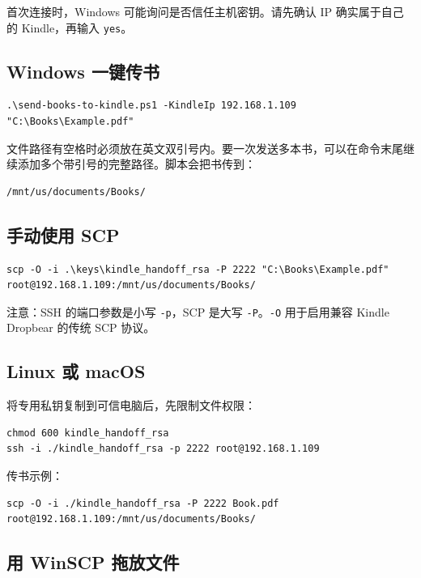 \documentclass[10pt,a4paper]{article}
\begin{document}
首次连接时，Windows 可能询问是否信任主机密钥。请先确认 IP 确实属于自己的 Kindle，再输入 \texttt{yes}。

\subsection{Windows 一键传书}

\begin{Verbatim}[fontsize=\small]
.\send-books-to-kindle.ps1 -KindleIp 192.168.1.109 "C:\Books\Example.pdf"
\end{Verbatim}

文件路径有空格时必须放在英文双引号内。要一次发送多本书，可以在命令末尾继续添加多个带引号的完整路径。脚本会把书传到：

\begin{Verbatim}[fontsize=\small]
/mnt/us/documents/Books/
\end{Verbatim}

\subsection{手动使用 SCP}

\begin{Verbatim}[fontsize=\footnotesize]
scp -O -i .\keys\kindle_handoff_rsa -P 2222 "C:\Books\Example.pdf" root@192.168.1.109:/mnt/us/documents/Books/
\end{Verbatim}

注意：SSH 的端口参数是小写 \texttt{-p}，SCP 是大写 \texttt{-P}。\texttt{-O} 用于启用兼容 Kindle Dropbear 的传统 SCP 协议。

\subsection{Linux 或 macOS}

将专用私钥复制到可信电脑后，先限制文件权限：

\begin{Verbatim}[fontsize=\small]
chmod 600 kindle_handoff_rsa
ssh -i ./kindle_handoff_rsa -p 2222 root@192.168.1.109
\end{Verbatim}

传书示例：

\begin{Verbatim}[fontsize=\small]
scp -O -i ./kindle_handoff_rsa -P 2222 Book.pdf root@192.168.1.109:/mnt/us/documents/Books/
\end{Verbatim}

\subsection{用 WinSCP 拖放文件}
\end{document}

